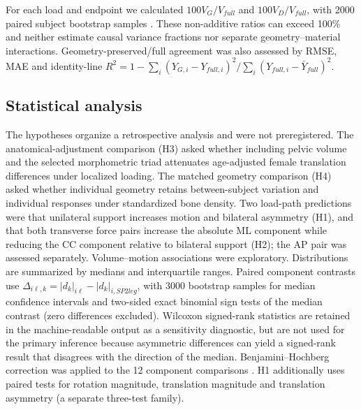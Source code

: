 For each load and endpoint we calculated $100V_G/V_{full}$ and $100V_D/V_{full}$, with 2000 paired subject bootstrap samples \citep{EfronTibshirani1994}. These non-additive ratios can exceed 100\% and neither estimate causal variance fractions nor separate geometry--material interactions. Geometry-preserved/full agreement was also assessed by RMSE, MAE and identity-line $R^2=1-\sum_i(Y_{G,i}-Y_{full,i})^2/\sum_i(Y_{full,i}-\bar Y_{full})^2$.

\subsection{Statistical analysis}
The hypotheses organize a retrospective analysis and were not preregistered. The anatomical-adjustment comparison (H3) asked whether including pelvic volume and the selected morphometric triad attenuates age-adjusted female translation differences under localized loading. The matched geometry comparison (H4) asked whether individual geometry retains between-subject variation and individual responses under standardized bone density. Two load-path predictions were that unilateral support increases motion and bilateral asymmetry (H1), and that both transverse force pairs increase the absolute ML component while reducing the CC component relative to bilateral support (H2); the AP pair was assessed separately. Volume--motion associations were exploratory. Distributions are summarized by medians and interquartile ranges. Paired component contrasts use $\Delta_{i\ell,k}=|d_k|_{i\ell}-|d_k|_{i,SP2leg}$, with 3000 bootstrap samples for median confidence intervals and two-sided exact binomial sign tests of the median contrast (zero differences excluded). Wilcoxon signed-rank statistics \citep{Wilcoxon1945} are retained in the machine-readable output as a sensitivity diagnostic, but are not used for the primary inference because asymmetric differences can yield a signed-rank result that disagrees with the direction of the median. Benjamini--Hochberg correction was applied to the 12 component comparisons \citep{BenjaminiHochberg1995}. H1 additionally uses paired tests for rotation magnitude, translation magnitude and translation asymmetry (a separate three-test family).

